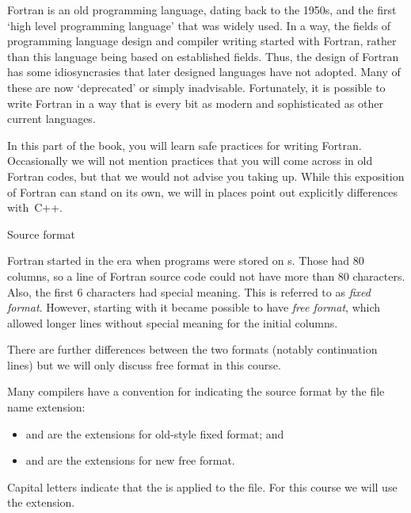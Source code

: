
Fortran is an old programming language, dating back to the 1950s, and
the first `high level programming language' that was widely used.
In a way, the fields of programming language design and compiler
writing started with Fortran, rather than this language being based on
established fields. Thus, the design of Fortran has some
idiosyncrasies that later designed languages have not adopted. Many of
these are now `deprecated' or simply inadvisable. Fortunately, it is
possible to write Fortran in a way that is every bit as modern and
sophisticated as other current languages.

In this part of the book, you will learn safe practices for
writing Fortran. Occasionally we will not mention practices that you
will come across in old Fortran codes, but that we would not advise
you taking up. While this exposition of Fortran can stand on its own,
we will in places point out explicitly differences with~C++.

 {Source format}

Fortran started in the era when programs were stored on
s. Those had 80 columns, so a line of Fortran
source code could not have more than 80 characters. Also, the first 6
characters had special meaning. This is referred to as \emph{fixed
  format}. However, starting with
 it became possible to have \emph{free
  format}, which allowed longer lines
without special meaning for the initial columns.

There are further differences between the two formats (notably
continuation lines) but we will only discuss free format in this course.

Many compilers have a convention for indicating the source format by
the file name extension:
\begin{itemize}
\item {} and  are the extensions for old-style fixed format;
  and
\item {} and  are the extensions for new free format.
\end{itemize}
Capital letters indicate that the 
is applied to the file.
For this course we will use the  extension.

